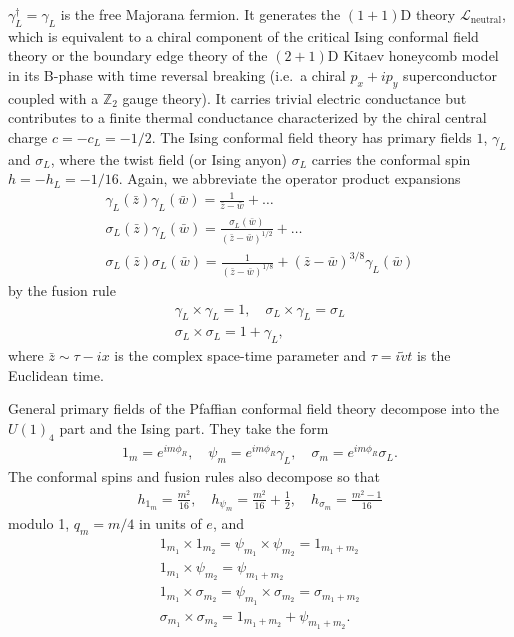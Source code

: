 $\gamma_L^\dagger=\gamma_L$ is the free Majorana fermion. It generates the $(1+1)$D theory $\mathcal{L}_{\mathrm{neutral}}$, which is equivalent to a chiral component of the critical Ising conformal field theory or the boundary edge theory of the $(2+1)$D Kitaev honeycomb model~\cite{Kitaev06} in its B-phase with time reversal breaking (i.e.~a chiral $p_x+ip_y$ superconductor coupled with a $\mathbb{Z}_2$ gauge theory). It carries trivial electric conductance but contributes to a finite thermal conductance characterized by the chiral central charge $c=-c_L=-1/2$. The Ising conformal field theory has primary fields $1$, $\gamma_L$ and $\sigma_L$, where the twist field (or Ising anyon) $\sigma_L$ carries the conformal spin $h=-h_L=-1/16$. Again, we abbreviate the operator product expansions \begin{gather}\gamma_L(\bar{z})\gamma_L(\bar{w})=\frac{1}{\bar{z}-\bar{w}}+\ldots\nonumber\\\sigma_L(\bar{z})\gamma_L(\bar{w})=\frac{\sigma_L(\bar{w})}{(\bar{z}-\bar{w})^{1/2}}+\ldots\nonumber\\\sigma_L(\bar{z})\sigma_L(\bar{w})=\frac{1}{(\bar{z}-\bar{w})^{1/8}}+(\bar{z}-\bar{w})^{3/8}\gamma_L(\bar{w})\nonumber\end{gather} by the fusion rule \begin{gather}\gamma_L\times\gamma_L=1,\quad\sigma_L\times\gamma_L=\sigma_L\nonumber\\\sigma_L\times\sigma_L=1+\gamma_L,\end{gather} where $\bar{z}\sim\tau-ix$ is the complex space-time parameter and $\tau=i\tilde{v}t$ is the Euclidean time. 

General primary fields of the Pfaffian conformal field theory decompose into the $U(1)_4$ part and the Ising part. They take the form \begin{align}1_m=e^{im\phi_R},\quad\psi_m=e^{im\phi_R}\gamma_L,\quad\sigma_m=e^{im\phi_R}\sigma_L.\label{Pfaffianfields}\end{align} The conformal spins and fusion rules also decompose so that \begin{align}h_{1_m}=\frac{m^2}{16},\quad h_{\psi_m}=\frac{m^2}{16}+\frac{1}{2},\quad h_{\sigma_m}=\frac{m^2-1}{16}\end{align} modulo 1, $q_m=m/4$ in units of $e$, and \begin{gather}1_{m_1}\times1_{m_2}=\psi_{m_1}\times\psi_{m_2}=1_{m_1+m_2}\nonumber\\1_{m_1}\times\psi_{m_2}=\psi_{m_1+m_2}\nonumber\\1_{m_1}\times\sigma_{m_2}=\psi_{m_1}\times\sigma_{m_2}=\sigma_{m_1+m_2}\nonumber\\\sigma_{m_1}\times\sigma_{m_2}=1_{m_1+m_2}+\psi_{m_1+m_2}.\end{gather} 

